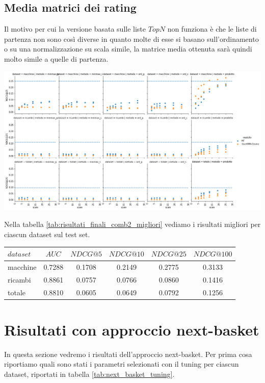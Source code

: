 \subsection{Media matrici dei rating}
Il motivo per cui la versione basata sulle liste $TopN$ non funziona è che le liste di partenza non sono così diverse in quanto molte di esse si basano sull'ordinamento o su una normalizzazione su scala simile, la matrice media ottenuta sarà quindi molto simile a quelle di partenza.
\begin{center}
\includegraphics[width=16cm]{figures/comb_2.png}
\label{tab:risultati_finali_comb2}
\end{center}
Nella tabella \ref{tab:risultati_finali_comb2_migliori} vediamo i risultati migliori per ciascun dataset sul test set.
\begin{center}
\begin{tabular}{|l|ccccc|}
    \toprule
    $dataset$  & $AUC$ & $NDCG@5$ & $NDCG@10$  & $NDCG@25$ & $NDCG@100$  \\
    \midrule
    macchine & 0.7288 & 0.1708 & 0.2149 & 0.2775 & 0.3133 \\
    ricambi & 0.8861  & 0.0757 & 0.0766 & 0.0860 & 0.1416 \\
    totale  & 0.8810  & 0.0605 & 0.0649 & 0.0792 & 0.1256 \\
\bottomrule
\end{tabular}
\label{tab:risultati_finali_comb2_migliori}
\end{center}
\section{Risultati con approccio next-basket}
In questa sezione vedremo i risultati dell'approccio next-basket. Per prima cosa riportiamo quali sono stati i parametri selezionati con il tuning per ciascun dataset, riportati in tabella \ref{tab:next_basket_tuning}.\\

